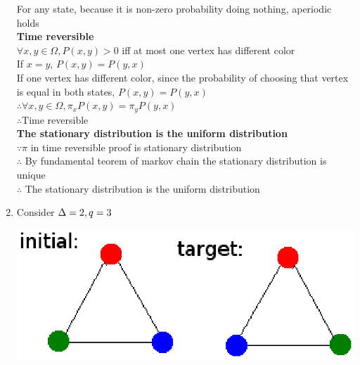 \documentclass[12pt]{article}
\begin{document}
\begin{enumerate}
For any state, because it is non-zero probability doing nothing, aperiodic holds\\

\textbf{Time reversible}\\

$\forall x,y\in \Omega, P(x,y)>0$ iff at most one vertex has different color\\
If $x=y$, $P(x,y)=P(y,x)$\\
If one vertex has different color, since the probability of choosing that vertex is equal in both states, $P(x,y)=P(y,x)$\\
$\therefore \forall x,y\in \Omega, \pi_xP(x,y)=\pi_yP(y,x)$\\
$\therefore$Time reversible\\

\textbf{The stationary distribution is the uniform distribution}\\

$\because \pi$ in time reversible proof is stationary distribution\\
$\therefore$ By fundamental teorem of markov chain the stationary distribution is unique \\
$\therefore$ The stationary distribution is the uniform distribution
\item
Consider $\Delta=2, q=3$

\includegraphics[scale=0.8]{a}\\

\end{enumerate}
\end{document}
